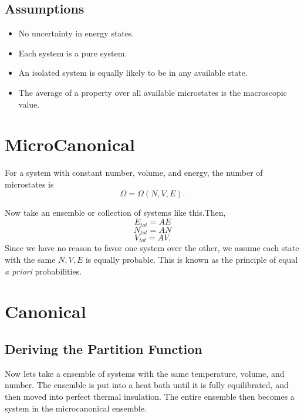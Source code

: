 
\subsection{Assumptions}

\begin{itemize}

	\item No uncertainty in energy states.

	\item Each system is a pure system.

	\item An isolated system is equally likely to be in any available state.

	\item The average of a property over all available microstates is the
		macroscopic value.

\end{itemize}

\section{MicroCanonical}\label{sec:ch2MicroCanonical}

For a system with constant number, volume, and energy, the number of microstates
is \[ \Omega = \Omega(N, V, E).\]

Now take an ensemble or collection of systems like this.Then, \[ E_{tot} = A E
\]\[N_{tot} = A N \] \[ V_{tot} = A V.\]  Since we have no reason to favor one
system over the other, we assume each state with the same $N, V, E$ is equally
probable. This is known as the principle of equal \textit{a priori}
probabilities. 

\section{Canonical}\label{sec:Canonical}

\subsection{Deriving the Partition Function}

Now lets take a ensemble of systems with the same temperature, volume, and
number. The ensemble is put into a heat bath until it is fully equilibrated,
and then moved into perfect thermal insulation. The entire ensemble then becomes
a system in the microcanonical ensemble.

